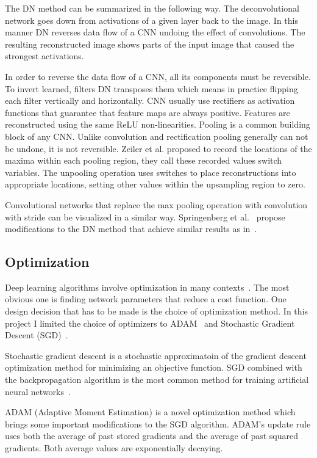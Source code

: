 \documentclass[a4paper, 11pt, table]{article}
\begin{document}
The DN method can be summarized in the following way. The deconvolutional network goes down from activations of a given layer back to the image. In this manner DN reverses data flow of a CNN undoing the effect of convolutions. The resulting reconstructed image shows parts of the input image that caused the strongest activations. 

In order to reverse the data flow of a CNN, all its components must be reversible. To invert learned, filters DN transposes them which means in practice flipping each filter vertically and horizontally. CNN usually use rectifiers as activation functions that guarantee that feature maps are always positive. Features are reconstructed using the same ReLU non-linearities. Pooling is a common building block of any CNN. Unlike convolution and rectification pooling generally can not be undone, it is not reversible. Zeiler et al. proposed to record the locations of the maxima within each pooling region, they call these recorded values switch variables. The unpooling operation uses switches to place reconstructions into appropriate locations, setting other values within the upsampling region to zero.

Convolutional networks that replace the max pooling operation with convolution with stride can be visualized in a similar way. Springenberg et al.~\cite{DBLP:journals/corr/SpringenbergDBR14} propose modifications to the DN method that achieve similar results as in~\cite{Zeiler2014}.

\subsection{Optimization}
Deep learning algorithms involve optimization in many contexts~\cite{dl_book}. The most obvious one is finding network parameters that reduce a cost function. One design decision that has to be made is the choice of optimization method. In this project I limited the choice of optimizers to ADAM~\cite{DBLP:journals/corr/KingmaB14} and Stochastic Gradient Descent (SGD)~\cite{Zhang04solvinglarge}. 

Stochastic gradient descent is a stochastic approximatoin of the gradient descent optimization method for minimizing an objective function. SGD combined with the backpropagation algorithm is the most common method for training artificial neural networks~\cite{LeCun1998}.

ADAM (Adaptive Moment Estimation) is a novel optimization method which brings some important modifications to the SGD algorithm. ADAM's update rule uses both the average of past stored gradients and the average of past squared gradients. Both average values are exponentially decaying. 
\end{document}

